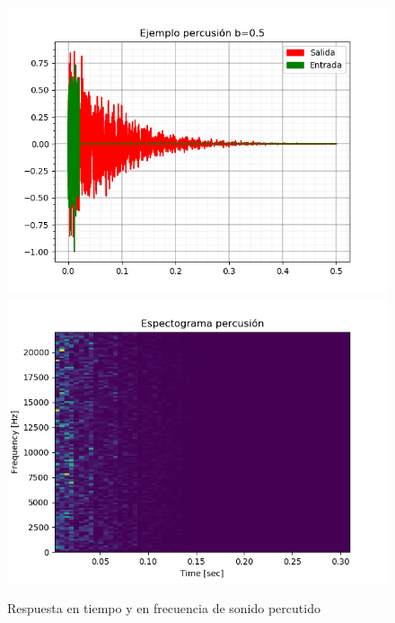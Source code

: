 \documentclass[assd_tp2_main.tex]{subfiles}
\begin{document}
\begin{figure}[H]
	\begin{center}
	\includegraphics[scale=0.5]{graficos/ejemplo_percusion_tiempo.png}
	\includegraphics[scale=0.5]{graficos/espectograma_percusion.png}
	\caption{Respuesta en tiempo y en frecuencia de sonido percutido}

	\end{center}
\end{figure}
\end{document}

